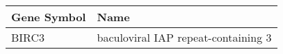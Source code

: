 \begin{tabular}{ll}
\toprule
Gene Symbol &                                Name \\
\midrule
      BIRC3 & baculoviral IAP repeat-containing 3 \\
\bottomrule
\end{tabular}
